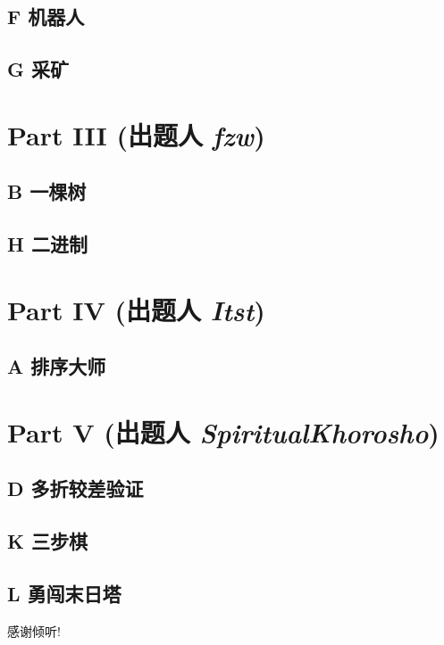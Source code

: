 \documentclass[dvipsnames]{ctexbeamer}
\begin{document}
\subsection{F 机器人}


\subsection{G 采矿}


\section{Part III (出题人 {\itshape fzw})}

\subsection{B 一棵树}


\subsection{H 二进制}


\section{Part IV (出题人 {\itshape Itst})}

\subsection{A 排序大师}



\section{Part V (出题人 {\itshape SpiritualKhorosho})}

\subsection{D 多折较差验证}


\subsection{K 三步棋}


\subsection{L 勇闯末日塔}


\begin{frame}{}
    \begin{center}
        \Large 感谢倾听!
    \end{center}
\end{frame}
\end{document}
